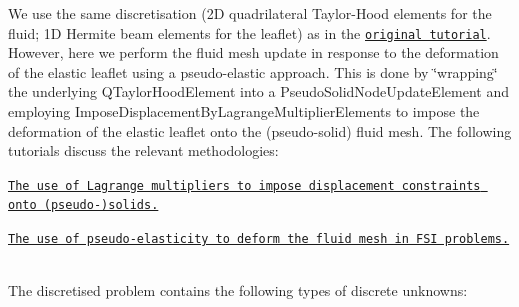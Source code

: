 We use the same discretisation (2D quadrilateral Taylor-\/\+Hood elements for the fluid; 1D Hermite beam elements for the leaflet) as in the \href{../../../interaction/fsi_channel_with_leaflet/html/index.html}{\tt original tutorial}. However, here we perform the fluid mesh update in response to the deformation of the elastic leaflet using a pseudo-\/elastic approach. This is done by \char`\"{}wrapping\char`\"{} the underlying {\ttfamily Q\+Taylor\+Hood\+Element} into a {\ttfamily Pseudo\+Solid\+Node\+Update\+Element} and employing {\ttfamily Impose\+Displacement\+By\+Lagrange\+Multiplier\+Elements} to impose the deformation of the elastic leaflet onto the (pseudo-\/solid) fluid mesh. The following tutorials discuss the relevant methodologies\+:
\begin{DoxyItemize}
\item \href{../../../solid/prescribed_displ_lagr_mult/html/index.html}{\tt The use of Lagrange multipliers to impose displacement constraints onto (pseudo-\/)solids.}~\newline
~\newline

\item \href{../../../interaction/unstructured_fsi/html/index.html}{\tt The use of pseudo-\/elasticity to deform the fluid mesh in F\+SI problems.} ~\newline
~\newline

\end{DoxyItemize}The discretised problem contains the following types of discrete unknowns\+:
